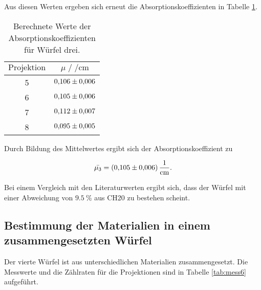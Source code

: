 Aus diesen Werten ergeben sich erneut die Absorptionskoeffizienten in Tabelle \ref{tab:mess5}.

\begin{table}[H]
  \centering
  \caption{Berechnete Werte der Absorptionskoeffizienten für Würfel drei.}
  \label{tab:mess5}
  \begin{tabular}{c c}
  \toprule
  $\text{Projektion}$ & $\mu \;/\; \si{\per\centi\metre}$\\
  \midrule
      5 & $\num{0.106+-0.006}$\\
      6 & $\num{0.105+-0.006}$\\
      7 & $\num{0.112+-0.007}$\\
      8 & $\num{0.095+-0.005}$\\
  \bottomrule
  \end{tabular}
\end{table}

Durch Bildung des Mittelwertes ergibt sich der Absorptionskoeffizient zu 

\begin{equation*}
  \bar{\mu_3} = \SI{0.105+-0.006}{\per\centi\metre}. 
\end{equation*}

Bei einem Vergleich mit den Literaturwerten ergibt sich, dass der Würfel mit einer Abweichung von 
$\SI{9.5}{\percent}$ aus CH20 zu bestehen scheint. 

\subsection{Bestimmung der Materialien in einem zusammengesetzten Würfel}

Der vierte Würfel ist aus unterschiedlichen Materialien zusammengesetzt. Die Messwerte und die Zählraten für die Projektionen 
sind in Tabelle \ref{tab:mess6} aufgeführt.

